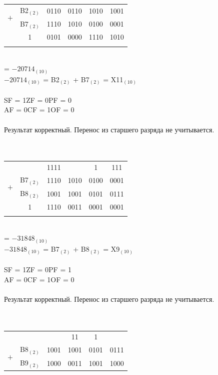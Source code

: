 \documentclass[11pt]{article}
\begin{document}
\begin{paracol}{2}
\begin{enumerate}
\begin{tabular}[t]{cccccc}
			\multirow{2}{*}{$+$} & B2$_{(2)}$ & 0110 & 0110 & 1010 & 1001\\
						            & B7$_{(2)}$ & 1110 & 1010 & 0100 & 0001\\
			\cline{2-6}
						        &   \phantom{000}1     & 0101 & 0000 & 1110 & 1010\\
		\\
		\end{tabular}\\
		= $-20714_{(10)}$\\
		\phantom{=} $-20714_{(10)}$ = B2$_{(2)}$ + B7$_{(2)}$ = X11$_{(10)}$\\\\
		SF = 1\qquad ZF = 0\qquad PF = 0 \\
		AF = 0\qquad CF = 1\qquad OF = 0\\\\
		Результат корректный. Перенос из старшего разряда не учитывается.
		\\\\\\
		\begin{tabular}[t]{cccccc}
			&&1111&&1\phantom{111}&111\phantom{1}\\
			\multirow{2}{*}{$+$}  & B7$_{(2)}$ & 1110 & 1010 & 0100 & 0001\\
						            & B8$_{(2)}$ & 1001 & 1001 & 0101 & 0111\\
			\cline{2-6}
						       &   1     & 1110 & 0011 & 0001 & 0001\\
		\\
		\end{tabular}\\
		= $-31848_{(10)}$\\
		\phantom{=} $-31848_{(10)}$ = B7$_{(2)}$ + B8$_{(2)}$ = X9$_{(10)}$\\\\
		SF = 1\qquad ZF = 0\qquad PF = 1 \\
		AF = 0\qquad CF = 1\qquad OF = 0\\\\
		Результат корректный. Перенос из старшего разряда не учитывается.
		\\\\\\
		\begin{tabular}[t]{cccccc}
			&&&\phantom{1}11\phantom{1}&\phantom{11}1\phantom{1}&\\
			\multirow{2}{*}{$+$}  & B8$_{(2)}$ & 1001 & 1001 & 0101 & 0111\\
						            & B9$_{(2)}$ & 1000 & 0011 &  1001 & 1000\\

\end{tabular}
\end{enumerate}
\end{paracol}
\end{document}
